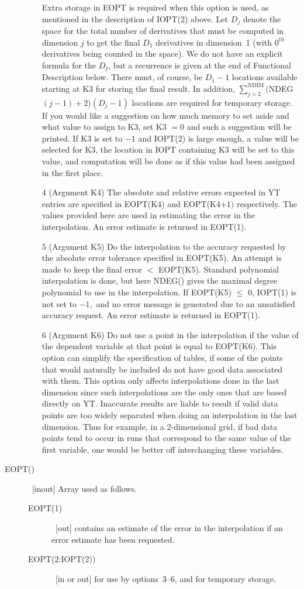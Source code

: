 \documentclass[twoside]{MATH77}
\begin{document}
\begin{description}
\begin{itemize}
Extra storage in EOPT is required when this option is used, as mentioned in
the description of IOPT(2) above. Let $D_j$ denote the space for the total
number of derivatives that must be computed in dimension $j$ to get the
final $D_1$ derivatives in dimension~1 (with $0^{th}$ derivatives being
counted in the space). We do not have an explicit formula for the $D_j$, but
a recurrence is given at the end of Functional Description below. There
must, of course, be $D_1-1$ locations available starting at K3 for storing
the final result. In addition, $\sum_{j=2}^{\text{NDIM}}($NDEG$%
(j-1)+2)(D_j-1)$ locations are required for temporary storage. If you would
like a suggestion on how much memory to set aside and what value to assign
to K3, set K3 $=0$ and such a suggestion will be printed. If K3 is set to $%
-1 $ and IOPT(2) is large enough, a value will be selected for K3, the
location in IOPT containing K3 will be set to this value, and computation
will be done as if this value had been assigned in the first place.
\item[4]  (Argument K4) The absolute and relative errors expected in YT
entries are specified in EOPT(K4) and EOPT(K4$+1)$ respectively. The values
provided here are used in estimating the error in the interpolation. An
error estimate is returned in EOPT(1).
\item[5]  (Argument K5) Do the interpolation to the accuracy requested by
the absolute error tolerance specified in EOPT(K5). An attempt is made to
keep the final error $<$ EOPT(K5). Standard polynomial interpolation is
done, but here NDEG() gives the maximal degree polynomial to use in the
interpolation. If EOPT(K5) $\leq $ 0, IOPT(1) is not set to $-1,$ and no
error message is generated due to an unsatisfied accuracy request. An error
estimate is returned in EOPT(1).
\item[6]  (Argument K6) Do not use a point in the interpolation if the value
of the dependent variable at that point is equal to EOPT(K6). This option
can simplify the specification of tables, if some of the points that would
naturally be included do not have good data associated with them. This
option only affects interpolations done in the last dimension since such
interpolations are the only ones that are based directly on YT. Inaccurate
results are liable to result if valid data points are too widely separated
when doing an interpolation in the last dimension. Thus for example, in a
2-dimensional grid, if bad data points tend to occur in runs that correspond
to the same value of the first variable, one would be better off
interchanging these variables.
\end{itemize}
\item[EOPT()]  \ [inout] Array used as follows.
\begin{description}
\item[EOPT(1)]  \ [out] contains an estimate of the error in the
interpolation if an error estimate has been requested.
\item[EOPT(2:IOPT(2))]  \ [in or out] for use by options~3--6, and for
temporary storage.
\end{description}
\end{description}
\end{document}

